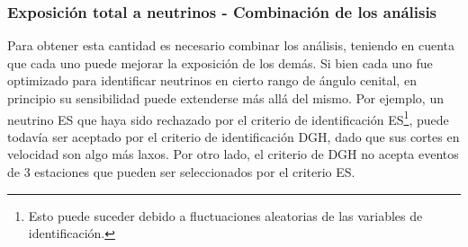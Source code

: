 	\subsubsection{Exposición total a neutrinos - Combinaci\'on de los análisis}
	
	Para obtener esta cantidad es necesario combinar los análisis, teniendo en cuenta que cada uno puede mejorar la exposición de los demás.
	Si bien cada uno fue optimizado para identificar neutrinos en cierto rango de ángulo cenital, en principio su sensibilidad puede extenderse más allá del mismo.
	Por ejemplo, un neutrino ES que haya sido rechazado por el criterio de identificación ES\footnote{Esto puede suceder debido a fluctuaciones aleatorias de las variables de identificaci\'on.}, puede todav\'ia ser aceptado por el criterio de identificación DGH, dado que sus cortes en velocidad son algo más laxos.
	Por otro lado, el criterio de DGH no acepta eventos de 3 estaciones que pueden ser seleccionados por el criterio ES.
	
